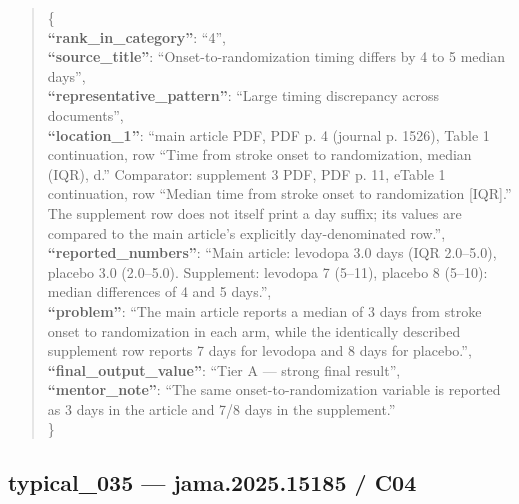 \documentclass[
  letterpaper,
  9pt]{extreport}
\begin{document}
\begin{quote}
\{\\
\textbf{``rank\_in\_category''}: ``4'',\\
\textbf{``source\_title''}: ``Onset-to-randomization timing differs by 4
to 5 median days'',\\
\textbf{``representative\_pattern''}: ``Large timing discrepancy across
documents'',\\
\textbf{``location\_1''}: ``main article PDF, PDF p. 4 (journal p.
1526), Table 1 continuation, row ``Time from stroke onset to
randomization, median (IQR), d.'' Comparator: supplement 3 PDF, PDF p.
11, eTable 1 continuation, row ``Median time from stroke onset to
randomization {[}IQR{]}.'' The supplement row does not itself print a
day suffix; its values are compared to the main article's explicitly
day-denominated row.'',\\
\textbf{``reported\_numbers''}: ``Main article: levodopa 3.0 days (IQR
2.0--5.0), placebo 3.0 (2.0--5.0). Supplement: levodopa 7 (5--11),
placebo 8 (5--10): median differences of 4 and 5 days.'',\\
\textbf{``problem''}: ``The main article reports a median of 3 days from
stroke onset to randomization in each arm, while the identically
described supplement row reports 7 days for levodopa and 8 days for
placebo.'',\\
\textbf{``final\_output\_value''}: ``Tier A --- strong final result'',\\
\textbf{``mentor\_note''}: ``The same onset-to-randomization variable is
reported as 3 days in the article and 7/8 days in the supplement.''\\
\}
\end{quote}

\hypertarget{typical_035--jama202515185--c04}{%
\subsection{typical\_035 --- jama.2025.15185 /
C04}\label{typical_035--jama202515185--c04}}
\end{document}
